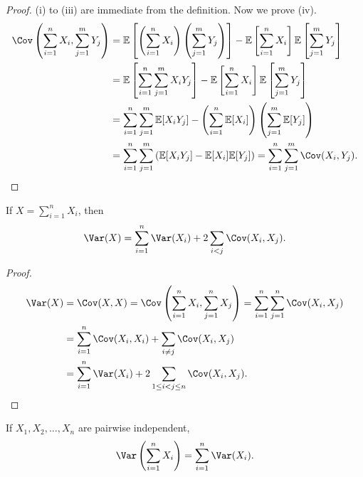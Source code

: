 \begin{proof}
    (i) to (iii) are immediate from the definition. Now we prove (iv). 
    \begin{align*}
        \Cov \left( \sum_{i=1}^n X_i, \sum_{j=1}^m Y_j   \right) &= \mathbb{E} \left[ \left( \sum_{i=1}^n X_i  \right) \left( \sum_{j=1}^m Y_j  \right)   \right] - \mathbb{E} \left[ \sum_{i=1}^n X_i  \right] \mathbb{E} \left[ \sum_{j=1}^m Y_j  \right] \\
        &= \mathbb{E} \left[ \sum_{i=1}^n \sum_{j=1}^m X_i Y_j   \right] - \mathbb{E} \left[ \sum_{i=1}^n X_i  \right] \mathbb{E} \left[ \sum_{j=1}^m Y_j  \right] \\
        &= \sum_{i=1}^n \sum_{j=1}^m \mathbb{E} [X_i Y_j] - \left( \sum_{i=1}^n \mathbb{E} [X_i]  \right) \left( \sum_{j=1}^m \mathbb{E} [Y_j]  \right) \\
        &= \sum_{i=1}^n \sum_{j=1}^m \left( \mathbb{E} [X_i Y_j] - \mathbb{E} [X_i] \mathbb{E} [Y_j] \right) = \sum_{i=1}^n \sum_{j=1}^m \Cov(X_i, Y_j).         
    \end{align*}
\end{proof}

\begin{corollary}
    If \(X = \sum_{i=1}^n X_i \), then 
    \[
        \Var (X) = \sum_{i=1}^n \Var(X_i) + 2 \sum_{i < j} \Cov(X_i, X_j).  
    \] 
\end{corollary}

\begin{proof}
    \begin{align*}
        \Var(X) &= \Cov(X, X) = \Cov \left( \sum_{i=1}^n X_i, \sum_{j=1}^n X_j   \right) = \sum_{i=1}^n \sum_{j=1}^n \Cov (X_i, X_j) \\
        &= \sum_{i=1}^n \Cov(X_i, X_i) + \sum_{i \neq j} \Cov(X_i, X_j) \\
        &= \sum_{i=1}^n \Var(X_i) + 2 \sum_{1 \le i < j \le n} \Cov(X_i, X_j).       
    \end{align*}
\end{proof}

\begin{corollary}
    If \(X_1, X_2, \dots , X_n\) are pairwise independent, 
    \[
        \Var \left( \sum_{i=1}^n X_i  \right) = \sum_{i=1}^n \Var(X_i).  
    \] 
\end{corollary}

